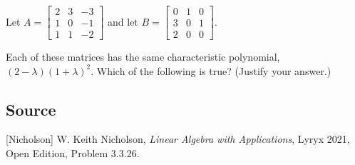 \documentclass{ximera}
\author{}
\begin{document}
\begin{exercise}
Let $A=\begin{bmatrix} 2 & 3 & -3 \\ 1 & 0 & -1 \\ 1 & 1 & -2 \end{bmatrix}$ and let $B=\begin{bmatrix} 0 & 1 & 0 \\ 3 & 0 & 1 \\ 2 & 0 & 0 \end{bmatrix}$.

Each of these matrices has the same characteristic polynomial, $(2-\lambda)(1+\lambda)^2$.  Which of the following is true?  (Justify your answer.)

 \begin{multipleChoice}
 \end{multipleChoice}

\end{exercise}

\subsection*{Source}
[Nicholson] W. Keith Nicholson, {\it Linear Algebra with Applications}, Lyryx 2021, Open Edition, Problem 3.3.26.
\end{document}
